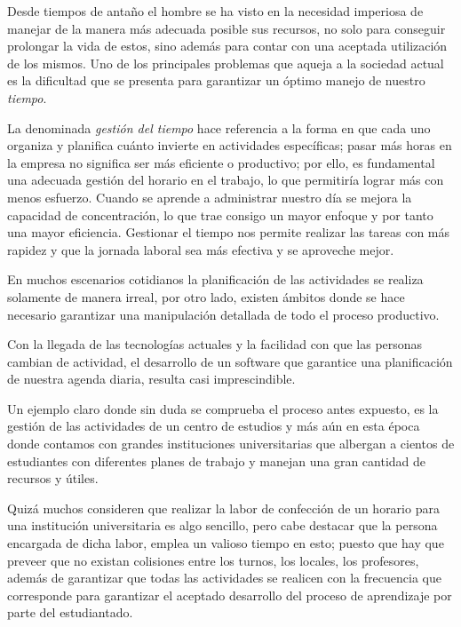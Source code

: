 \begin{introduction}
	Desde tiempos de antaño el hombre se ha visto en la necesidad imperiosa de manejar de la manera más adecuada posible sus recursos, no solo para conseguir prolongar la vida de estos, sino además para contar con una aceptada utilización de los mismos. Uno de los principales problemas que aqueja a la sociedad actual es la dificultad que se presenta para garantizar un óptimo manejo de nuestro \textit{tiempo}.
	
	La denominada \textit{gestión del tiempo} hace referencia a la forma en que cada uno organiza y planifica cuánto invierte en actividades específicas; pasar más horas en la empresa no significa ser más eficiente o productivo; por ello, es fundamental una adecuada gestión del horario en el trabajo, lo que permitiría lograr más con menos esfuerzo. Cuando se aprende a administrar nuestro día se mejora la capacidad de concentración, lo que trae consigo un mayor enfoque y por tanto una mayor eficiencia. Gestionar el tiempo nos permite realizar las tareas con más rapidez y que la jornada laboral sea más efectiva y se aproveche mejor.
	
	En muchos escenarios cotidianos la planificación de las actividades se realiza solamente de manera irreal, por otro lado, existen ámbitos donde se hace necesario garantizar una manipulación detallada de todo el proceso productivo.
	
	Con la llegada de las tecnologías actuales y la facilidad con que las personas cambian de actividad, el desarrollo de un software que garantice una planificación de nuestra agenda diaria, resulta casi imprescindible.
	
	Un ejemplo claro donde sin duda se comprueba el proceso antes expuesto, es la gestión de las actividades de un centro de estudios y más aún en esta época donde contamos con grandes instituciones universitarias que albergan a cientos de estudiantes con diferentes planes de trabajo y manejan una gran cantidad de recursos y útiles.
	
	Quizá muchos consideren que realizar la labor de confección de un horario para una institución universitaria es algo sencillo, pero cabe destacar que la persona encargada de dicha labor, emplea un valioso tiempo en esto; puesto que hay que preveer que no existan colisiones entre los turnos, los locales, los profesores, además de garantizar que todas las actividades se realicen con la frecuencia que corresponde para garantizar el aceptado desarrollo del proceso de aprendizaje por parte del estudiantado.
	

\end{introduction}
